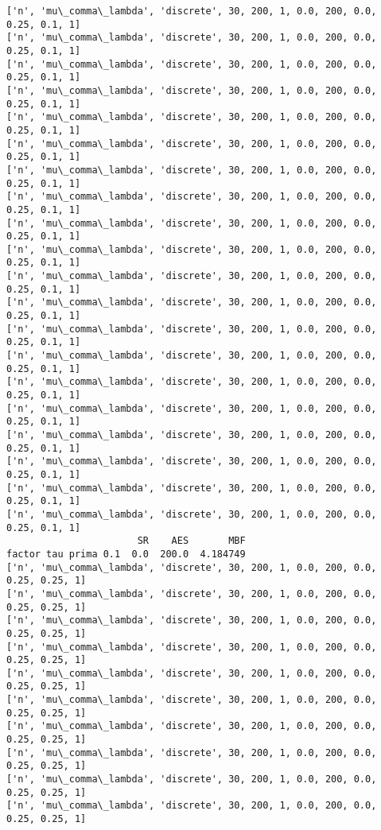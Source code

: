 \documentclass[11pt]{article}
\begin{document}
    \begin{Verbatim}[commandchars=\\\{\}]
['n', 'mu\_comma\_lambda', 'discrete', 30, 200, 1, 0.0, 200, 0.0, 0.25, 0.1, 1]
['n', 'mu\_comma\_lambda', 'discrete', 30, 200, 1, 0.0, 200, 0.0, 0.25, 0.1, 1]
['n', 'mu\_comma\_lambda', 'discrete', 30, 200, 1, 0.0, 200, 0.0, 0.25, 0.1, 1]
['n', 'mu\_comma\_lambda', 'discrete', 30, 200, 1, 0.0, 200, 0.0, 0.25, 0.1, 1]
['n', 'mu\_comma\_lambda', 'discrete', 30, 200, 1, 0.0, 200, 0.0, 0.25, 0.1, 1]
['n', 'mu\_comma\_lambda', 'discrete', 30, 200, 1, 0.0, 200, 0.0, 0.25, 0.1, 1]
['n', 'mu\_comma\_lambda', 'discrete', 30, 200, 1, 0.0, 200, 0.0, 0.25, 0.1, 1]
['n', 'mu\_comma\_lambda', 'discrete', 30, 200, 1, 0.0, 200, 0.0, 0.25, 0.1, 1]
['n', 'mu\_comma\_lambda', 'discrete', 30, 200, 1, 0.0, 200, 0.0, 0.25, 0.1, 1]
['n', 'mu\_comma\_lambda', 'discrete', 30, 200, 1, 0.0, 200, 0.0, 0.25, 0.1, 1]
['n', 'mu\_comma\_lambda', 'discrete', 30, 200, 1, 0.0, 200, 0.0, 0.25, 0.1, 1]
['n', 'mu\_comma\_lambda', 'discrete', 30, 200, 1, 0.0, 200, 0.0, 0.25, 0.1, 1]
['n', 'mu\_comma\_lambda', 'discrete', 30, 200, 1, 0.0, 200, 0.0, 0.25, 0.1, 1]
['n', 'mu\_comma\_lambda', 'discrete', 30, 200, 1, 0.0, 200, 0.0, 0.25, 0.1, 1]
['n', 'mu\_comma\_lambda', 'discrete', 30, 200, 1, 0.0, 200, 0.0, 0.25, 0.1, 1]
['n', 'mu\_comma\_lambda', 'discrete', 30, 200, 1, 0.0, 200, 0.0, 0.25, 0.1, 1]
['n', 'mu\_comma\_lambda', 'discrete', 30, 200, 1, 0.0, 200, 0.0, 0.25, 0.1, 1]
['n', 'mu\_comma\_lambda', 'discrete', 30, 200, 1, 0.0, 200, 0.0, 0.25, 0.1, 1]
['n', 'mu\_comma\_lambda', 'discrete', 30, 200, 1, 0.0, 200, 0.0, 0.25, 0.1, 1]
['n', 'mu\_comma\_lambda', 'discrete', 30, 200, 1, 0.0, 200, 0.0, 0.25, 0.1, 1]
                       SR    AES       MBF
factor tau prima 0.1  0.0  200.0  4.184749
['n', 'mu\_comma\_lambda', 'discrete', 30, 200, 1, 0.0, 200, 0.0, 0.25, 0.25, 1]
['n', 'mu\_comma\_lambda', 'discrete', 30, 200, 1, 0.0, 200, 0.0, 0.25, 0.25, 1]
['n', 'mu\_comma\_lambda', 'discrete', 30, 200, 1, 0.0, 200, 0.0, 0.25, 0.25, 1]
['n', 'mu\_comma\_lambda', 'discrete', 30, 200, 1, 0.0, 200, 0.0, 0.25, 0.25, 1]
['n', 'mu\_comma\_lambda', 'discrete', 30, 200, 1, 0.0, 200, 0.0, 0.25, 0.25, 1]
['n', 'mu\_comma\_lambda', 'discrete', 30, 200, 1, 0.0, 200, 0.0, 0.25, 0.25, 1]
['n', 'mu\_comma\_lambda', 'discrete', 30, 200, 1, 0.0, 200, 0.0, 0.25, 0.25, 1]
['n', 'mu\_comma\_lambda', 'discrete', 30, 200, 1, 0.0, 200, 0.0, 0.25, 0.25, 1]
['n', 'mu\_comma\_lambda', 'discrete', 30, 200, 1, 0.0, 200, 0.0, 0.25, 0.25, 1]
['n', 'mu\_comma\_lambda', 'discrete', 30, 200, 1, 0.0, 200, 0.0, 0.25, 0.25, 1]

\end{Verbatim}
\end{document}
